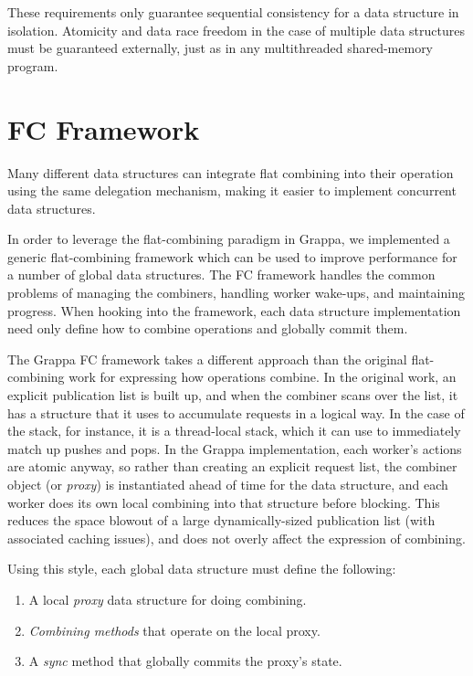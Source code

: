 
These requirements only guarantee sequential consistency for a data structure in isolation. Atomicity and data race freedom in the case of multiple data structures must be guaranteed externally, just as in any multithreaded shared-memory program.

\section{FC Framework}
Many different data structures can integrate flat combining into their operation using the same delegation mechanism, making it easier to implement concurrent data structures.

In order to leverage the flat-combining paradigm in Grappa, we implemented a generic flat-combining framework which can be used to improve performance for a number of global data structures. The FC framework handles the common problems of managing the combiners, handling worker wake-ups, and maintaining progress. When hooking into the framework, each data structure implementation need only define how to combine operations and globally commit them.

The Grappa FC framework takes a different approach than the original flat-combining work for expressing how operations combine. In the original work, an explicit publication list is built up, and when the combiner scans over the list, it has a structure that it uses to accumulate requests in a logical way. In the case of the stack, for instance, it is a thread-local stack, which it can use to immediately match up pushes and pops. In the Grappa implementation, each worker's actions are atomic anyway, so rather than creating an explicit request list, the combiner object (or \emph{proxy}) is instantiated ahead of time for the data structure, and each worker does its own local combining into that structure before blocking. This reduces the space blowout of a large dynamically-sized publication list (with associated caching issues), and does not overly affect the expression of combining.

Using this style, each global data structure must define the following:
\begin{enumerate}
  \item A local \emph{proxy} data structure for doing combining.
  \item \emph{Combining methods} that operate on the local proxy.
  \item A \emph{sync} method that globally commits the proxy's state.
\end{enumerate}

